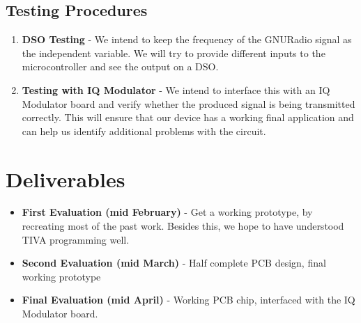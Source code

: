 \documentclass{article}
\begin{document}
\subsection{Testing Procedures}
\begin{enumerate}
\item \textbf{DSO Testing} - We intend to keep the frequency of the GNURadio signal as the independent variable. We will try to provide different inputs to the microcontroller and see the output on a DSO.
\item \textbf{Testing with IQ Modulator} - We intend to interface this with an IQ Modulator board and verify whether the produced signal is being transmitted correctly. This will ensure that our device has a working final application and can help us identify additional problems with the circuit.
\end{enumerate}
\section{Deliverables}

\begin{itemize}
\item \textbf{First Evaluation (mid February)} - Get a working prototype, by recreating most of the past work. Besides this, we hope to have understood TIVA programming well.
\item \textbf{Second Evaluation (mid March)} - Half complete PCB design, final working prototype
\item \textbf{Final Evaluation (mid April)} - Working PCB chip, interfaced with the IQ Modulator board.
\end{itemize}
\end{document}
